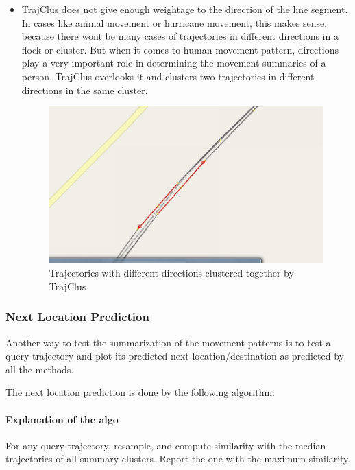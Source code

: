 \begin{itemize}
\item

TrajClus does not give enough weightage to the direction of the line segment. In cases like animal movement or hurricane movement, this makes sense, because there wont be many cases of trajectories in different directions in a flock or cluster. But when it comes to human movement pattern, directions play a very important role in determining the movement summaries of a person. TrajClus overlooks it and clusters two trajectories in different directions in the same cluster.

\begin{figure}
\centering     
\includegraphics[scale=0.3]{figs/direction.jpg}
\caption{Trajectories with different directions clustered together by TrajClus}
\label{fig:TrajClus_direction}  
\end{figure}

\end{itemize}
\subsubsection{Next Location Prediction}
Another way to test the summarization of the movement patterns is to test a query trajectory and plot its predicted next location/destination as predicted by all the methods.

The next location prediction is done by the following algorithm:
\paragraph{Explanation of the algo}
For any query trajectory, resample, and compute similarity with the median trajectories of all summary clusters. Report the one with the maximum similarity. 


